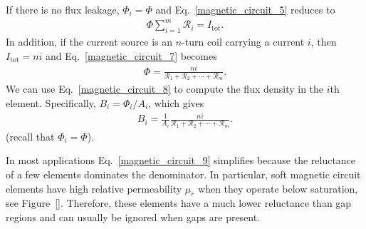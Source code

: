 \documentclass[11pt,a4paper,oneside]{book}
\numberwithin{equation}{section}
\theoremstyle{it}
\theoremstyle{definition}
\begin{document}
If there is no flux leakage, $\Phi_i=\Phi$ and Eq.~\eqref{magnetic_circuit_5} reduces to
\begin{equation}\label{magnetic_circuit_7}
	{\begin{aligned}
		\Phi\sum_{i=1}^{m}\mathscr{R}_i=I_\text{tot}.
	\end{aligned}}
\end{equation} 
In addition, if the current source is an $n$-turn coil carrying a current $i$, then $I_\text{tot}=ni$ and Eq.~\eqref{magnetic_circuit_7} becomes
\begin{equation}\label{magnetic_circuit_8}
	{\begin{aligned}
			\Phi=\frac{ni}{\mathscr{R}_1+\mathscr{R}_2+\cdots+\mathscr{R}_m}.
	\end{aligned}}
\end{equation} 
We can use Eq.~\eqref{magnetic_circuit_8} to compute the flux density in the $i$th element. Specifically, $B_i=\Phi_i/A_i$, which gives
\begin{equation}\label{magnetic_circuit_9}
	{\begin{aligned}
		B_i=\frac{1}{A_i}\frac{ni}{\mathscr{R}_1+\mathscr{R}_2+\cdots+\mathscr{R}_m}.
	\end{aligned}}
\end{equation} 
(recall that $\Phi_i=\Phi$).

In most applications Eq.~\eqref{magnetic_circuit_9} simplifies because the reluctance of a few elements dominates the denominator. In particular, soft magnetic circuit elements have high relative permeability $\mu_r$ when they operate below saturation, see Figure~\ref{}. Therefore, these elements have a much lower reluctance than gap regions and can usually be ignored when gaps are present.
\end{document}
